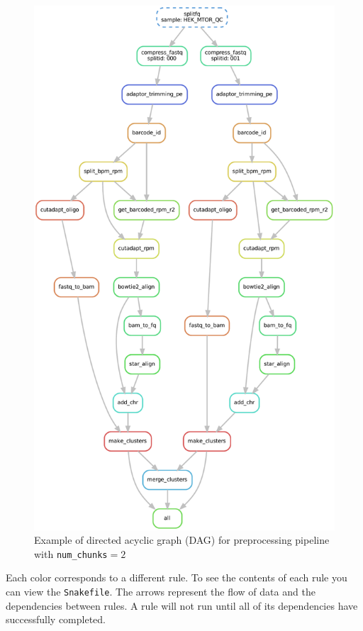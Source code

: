 \documentclass{article}
\begin{document}
    \begin{figure}[ht!]
        \centering
        \includegraphics[scale=0.5]{../pipeline/dag.pdf}
        \caption[short]{Example of directed acyclic graph (DAG) for preprocessing pipeline with \texttt{num\_chunks}$=2$}
    \end{figure}

    \noindent Each color corresponds to a different rule. To see the contents of each rule you can view the \texttt{Snakefile}. The arrows represent the flow of data and the dependencies between rules. A rule will not run until all of its dependencies have successfully completed.
\end{document}
